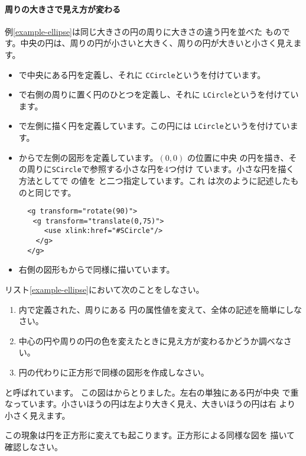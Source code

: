 \paragraph{周りの大きさで見え方が変わる}
例\ref{example-ellipse}は同じ大きさの円の周りに大きさの違う円を並べた
ものです。中央の円は、周りの円が小さいと大きく、周りの円が大きいと小さく見えます。
{}
\begin{itemize}
 \item {}で中央にある円を定義し、それに
       \texttt{CCircle}というを付けています。
 \item {}で右側の周りに置く円のひとつを定義し、それに
       \texttt{LCircle}というを付けています。
 \item {}で左側に描く円を定義しています。この円には
       \texttt{LCircle}というを付けています。
 \item {}からで左側の図形を定義しています。$(0,0)$
       の位置に中央
       の円を描き、その周りに\texttt{SCircle}で参照する小さな円を4つ付け
       ています。小さな円を描く方法としてで
       の値を
       と二つ指定しています。これ
       は次のように記述したものと同じです。
\begin{verbatim}
  <g transform="rotate(90)">
　　<g transform="translate(0,75)">
      <use xlink:href="#SCircle"/>
    </g>
  </g>
\end{verbatim}

 \item 右側の図形もからで同様に描いています。
\end{itemize}
\begin{Problem}\upshape
 リスト\ref{example-ellipse}において次のことをしなさい。
\begin{enumerate}
 \item {}内で定義された、周りにある
円の属性値を変えて、全体の記述を簡単にしなさい。
 \item 中心の円や周りの円の色を変えたときに見え方が変わるかどうか調べなさ
 い。
 \item 円の代わりに正方形で同様の図形を作成しなさい。
\end{enumerate}
\end{Problem}
{と呼ばれています。
この図は\cite[131ページ図12.7]{Ninio}からとりました。左右の単独にある円が中央
 で重なっています。小さいほうの円は左より大きく見え、大きいほうの円は右
 より小さく見えます。\par
この現象は円を正方形に変えても起こります。正方形による同様な図を
描いて確認しなさい。}
